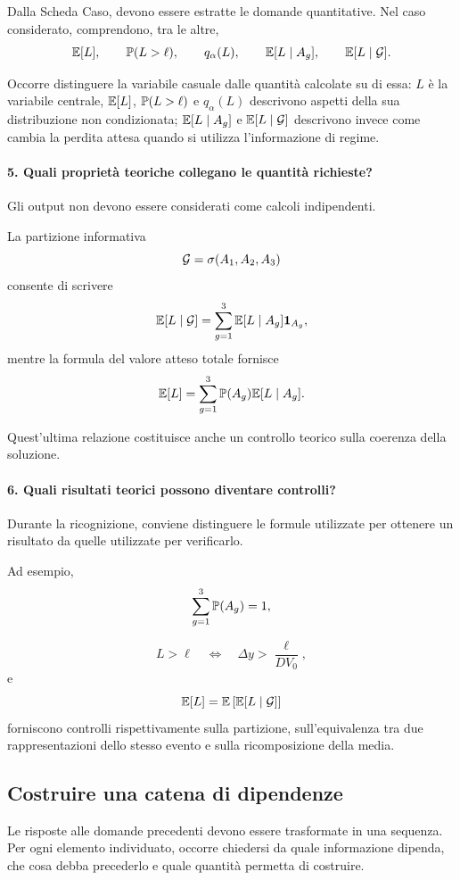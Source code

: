 Dalla Scheda Caso, devono essere estratte le domande quantitative. Nel caso
considerato, comprendono, tra le altre,
\[
\mathbb{E}[L],
\qquad
\mathbb{P}(L>\ell),
\qquad
q_{\alpha}(L),
\qquad
\mathbb{E}[L\mid A_g],
\qquad
\mathbb{E}[L\mid\mathcal{G}].
\]

Occorre distinguere la variabile casuale dalle quantit\`{a} calcolate su di
essa: $L$ \`{e} la variabile centrale, $\mathbb{E}[L]$,
$\mathbb{P}(L>\ell)$ e $q_{\alpha}(L)$ descrivono aspetti della sua distribuzione non condizionata; $\mathbb{E}[L\mid A_g]$ e $\mathbb{E}[L\mid\mathcal{G}]$ descrivono invece come cambia la perdita
attesa quando si utilizza l'informazione di regime.

\paragraph{5. Quali propriet\`{a} teoriche collegano le quantit\`{a} richieste?}

Gli output non devono essere considerati come calcoli indipendenti.

La partizione informativa
\[
\mathcal{G}=\sigma(A_{1},A_{2},A_{3})
\]
consente di scrivere
\[
\mathbb{E}[L\mid\mathcal{G}]
=
\sum_{g=1}^{3}
\mathbb{E}[L\mid A_g]\mathbf{1}_{A_g},
\]
mentre la formula del valore atteso totale fornisce
\[
\mathbb{E}[L]
=
\sum_{g=1}^{3}
\mathbb{P}(A_g)\mathbb{E}[L\mid A_g].
\]

Quest'ultima relazione costituisce anche un controllo teorico sulla coerenza
della soluzione.

\paragraph{6. Quali risultati teorici possono diventare controlli?}

Durante la ricognizione, conviene distinguere le formule utilizzate per
ottenere un risultato da quelle utilizzate per verificarlo.

Ad esempio,
\[
\sum_{g=1}^{3}\mathbb{P}(A_g)=1,
\]

\[
L>\ell
\quad\Longleftrightarrow\quad
\Delta y>\frac{\ell}{D V_{0}},
\]
e
\[
\mathbb{E}[L]
=
\mathbb{E}\left[\mathbb{E}[L\mid\mathcal{G}]\right]
\]
forniscono controlli rispettivamente sulla partizione, sull'equivalenza tra
due rappresentazioni dello stesso evento e sulla ricomposizione della media.

\subsection{Costruire una catena di dipendenze}

Le risposte alle domande precedenti devono essere trasformate in una sequenza.
Per ogni elemento individuato, occorre chiedersi da quale informazione dipenda,
che cosa debba precederlo e quale quantit\`{a} permetta di costruire.


